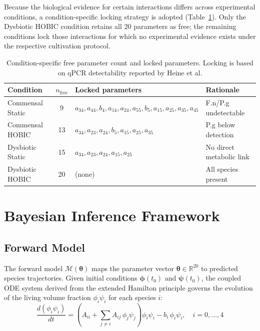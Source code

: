 \documentclass[11pt,a4paper]{article}
\begin{document}
Because the biological evidence for certain interactions differs across experimental conditions, a condition-specific locking strategy is adopted (Table~\ref{tab:free_params}). Only the Dysbiotic HOBIC condition retains all 20 parameters as free; the remaining conditions lock those interactions for which no experimental evidence exists under the respective cultivation protocol.

\begin{table}[h]
\centering
\small
\begin{tabular}{lcll}
\toprule
\textbf{Condition} & $n_\mathrm{free}$ & \textbf{Locked parameters} & \textbf{Rationale} \\
\midrule
Commensal Static & 9 & $a_{34}, a_{44}, b_4, a_{14}, a_{24}, a_{55}, b_5, a_{15}, a_{25}, a_{35}, a_{45}$ & F.n/P.g undetectable \\
Commensal HOBIC & 13 & $a_{34}, a_{23}, a_{24}, b_5, a_{15}, a_{25}, a_{35}$ & P.g below detection \\
Dysbiotic Static & 15 & $a_{34}, a_{23}, a_{24}, a_{15}, a_{25}$ & No direct metabolic link \\
Dysbiotic HOBIC & 20 & (none) & All species present \\
\bottomrule
\end{tabular}
\caption{Condition-specific free parameter count and locked parameters. Locking is based on qPCR detectability reported by Heine et al.}
\label{tab:free_params}
\end{table}

\section{Bayesian Inference Framework}
\label{sec:bayesian}

\subsection{Forward Model}

The forward model $\mathcal{M}(\boldsymbol{\theta})$ maps the parameter vector $\boldsymbol{\theta} \in \mathbb{R}^{20}$ to predicted species trajectories. Given initial conditions $\boldsymbol{\phi}(t_0)$ and $\boldsymbol{\psi}(t_0)$, the coupled ODE system derived from the extended Hamilton principle \cite{JunkerBalzani2021ExtendedHamilton, Klempt2025ContinuumBiofilm} governs the evolution of the living volume fraction $\phi_i \psi_i$ for each species $i$:
\begin{equation}
\frac{d(\phi_i \psi_i)}{dt} = \left( A_{ii} + \sum_{j \neq i} A_{ij}\, \phi_j \psi_j \right) \phi_i \psi_i - b_i\, \phi_i \psi_i, \quad i = 0, \ldots, 4
\label{eq:ode}
\end{equation}
\end{document}
